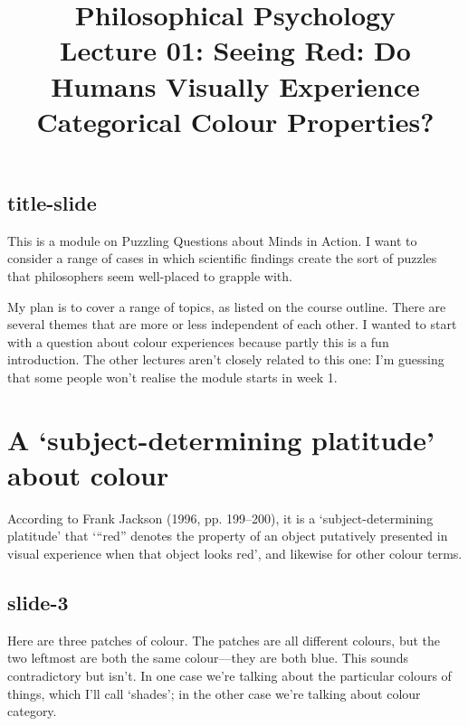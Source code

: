 \documentclass[12pt,\papersize]{extarticle}
\begin{document}
\setlength\footnotesep{1em}






\title {Philosophical Psychology \\ Lecture 01: Seeing Red: Do Humans Visually Experience Categorical Colour Properties?}



\maketitle

\subsection{title-slide}
This is a module on Puzzling Questions about Minds in Action.
I want to consider a range of cases in which scientific findings
create the sort of puzzles that philosophers seem well-placed
to grapple with.

My plan is to cover a range of topics, as listed on the course outline.
There are several themes that are more or less independent of each other.
I wanted to start with a question about colour experiences because
partly this is a fun introduction.
The other lectures aren’t closely related to this one: I’m guessing that
some people won’t realise the module starts in week 1.



\section{A ‘subject-determining platitude’ about colour}

According to Frank Jackson (1996, pp. 199–200),
it is a ‘subject-determining platitude’
that ‘“red” denotes the property of an object putatively presented in visual experience
when that object looks red’, and likewise for other colour terms.

\subsection{slide-3}
Here are three patches of colour.
The patches are all different colours, but the two leftmost are both the
same colour---they are both blue.
This sounds contradictory but isn't.
In one case we're talking about the particular colours of things,
which I’ll call ‘shades’; in the
other case we're talking about colour category.
\end{document}
